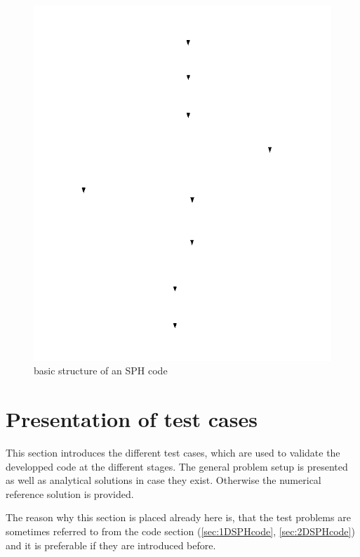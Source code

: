 \documentclass{report}
\begin{document}
\begin{figure}[h]
  \centering
     \includegraphics[width=1.0\textwidth]{Graphics/general_structure_SPH}
  \caption{basic structure of an SPH code}
  \label{fig:BasicSphCode}
\end{figure}



\section{Presentation of test cases}
\label{sec:testCases}
 
This section introduces the different test cases, which are used to validate the developped code at the different stages. The general problem setup is presented as well as analytical solutions in case they exist. Otherwise the numerical reference solution is provided.

The reason why this section is placed already here is, that the test problems are sometimes referred to from the code section (\ref{sec:1DSPHcode}, \ref{sec:2DSPHcode}) and it is preferable if they are introduced before.
\end{document}
